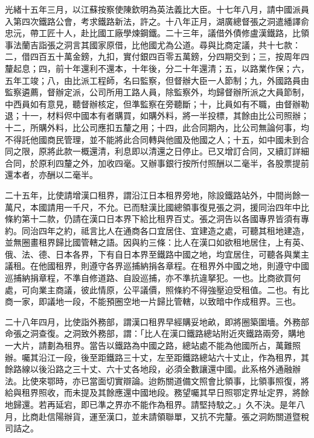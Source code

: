\begin{pinyinscope}
光緒十五年三月，以江蘇按察使陳欽明為英法義比大臣。十七年八月，請中國派員入第四次鐵路公會，考求鐵路新法，許之。十八年正月，湖廣總督張之洞遣繙譯俞忠沅，帶工匠十人，赴比國工廠學煉鋼鐵。二十三年，議借外債修盧漢鐵路，比領事法蘭吉詣張之洞言其國家原借，比他國尤為公道。尋與比商定議，共十七款：二，借四百五十萬金鎊，九扣，實付銀四百零五萬鎊，分四期交到；三，按周年四釐起息；四，前十年還利不還本，十年後，分二十年還清；五，以路業作保；六，五年工竣；八，由比派工程師，名曰監察，但督辦大臣一人節制；九，外國路員由監察遴薦，督辦定派，公司所用工路人員，除監察外，均歸督辦所派之大員節制，中西員如有意見，聽督辦核定，但準監察在旁聽斷；十，比員如有不職，由督辦勒退；十一，材料侭中國本有者購買，如購外料，將一半投標，其餘由比公司照辦；十二，所購外料，比公司應扣五釐之用；十四，此合同期內，比公司無論何事，均不得託他國商民管理，並不能將此合同轉與他國及他國之人；十五，如中國未到合同之限，原將此款一概還清，利息即以清還之日停止。已又增訂合同，又續訂詳細合同，於原利四釐之外，加收四毫。又辦事銀行按所付照酬以二毫半，各股票提前還本者，亦酬以二毫半。

二十五年，比使請增漢口租界，謂沿江日本租界旁地，除設鐵路站外，中間尚餘一萬尺，本國請用一千尺，不允。已而駐漢比國總領事復見張之洞，援同治四年中比條約第十二款，仍請在漢口日本界下給比租界百丈。張之洞告以各國專界皆須有專約。同治四年之約，祗言比人在通商各口宜居住、宜建造之處，可聽其租地建造，並無圈畫租界歸比國管轄之語。因與約三條：比人在漢口如欲租地居住，上有英、俄、法、德、日本各界，下有自日本界至鐵路中國之地，均宜居住，可聽各與業主議租。在他國租界，則遵守各界巡捕納捐各章程。在租界外中國之地，則遵守中國巡捕納捐章程，不準自修道路、自設巡捕，亦不準抗違拏犯。一也。比商欲買何處，可向業主商議，彼此情原，公平議價，照條約不得強壓迫受租值。二也。有比商一家，即議地一段，不能預圈空地一片歸比管轄，以致暗中作成租界。三也。

二十八年四月，比使詣外務部，謂漢口租界早經購妥地畝，即將圈築圍墻。外務部命張之洞查復。之洞致外務部，謂：「比人在漢口鐵路總站附近夾鐵路兩旁，購地一大片，請劃為租界。當告以鐵路為中國之路，總站處不能為他國所占，萬難照辦。囑其沿江一段，後至距鐵路三十丈，左至距鐵路總站六十丈止，作為租界，其餘路線以後沿路之三十丈、六十丈各地段，必須全數讓還中國。此系格外通融辦法。比使來鄂時，亦已當面切實辯論。迨飭關道備文照會比領事，比領事照復，將給與租界照收，而未提及其餘應還中國地段。務望囑其早日照鄂定界址定界，將餘地歸還。若再延宕，即已準之界亦不能作為租界。請堅持駮之。」久不決。是年八月，比商赴信陽辦貨，運至漢口，並未請領聯單，又抗不完釐。張之洞飭關道暨稅司詰之。


\end{pinyinscope}
